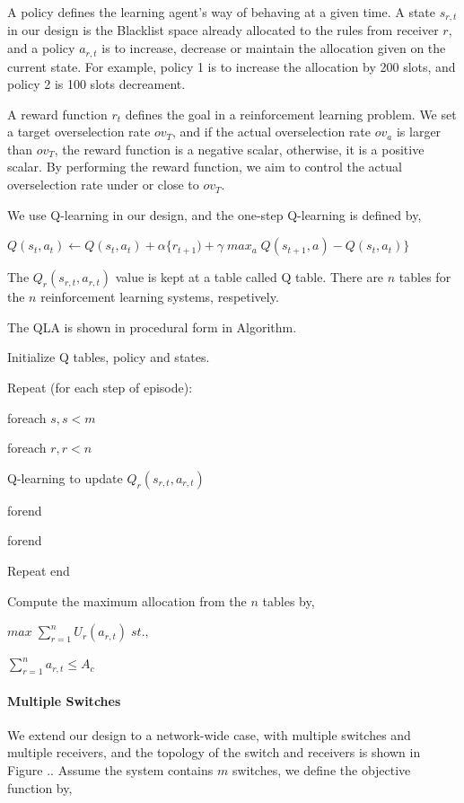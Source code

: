   A policy defines the learning agent's way of behaving at a given time. A state $s_{r,t}$ in our design is the Blacklist space already allocated to the rules from receiver $r$, and a policy $a_{r,t}$ is to increase, decrease or maintain the allocation given on the current state. For example, policy 1 is to increase the allocation by 200 slots, and policy 2 is 100 slots decreament. 
  
  A reward function $r_t$ defines the goal in a reinforcement learning problem. We set a target overselection rate $ov_T$, and if the actual overselection rate $ov_a$ is larger than $ov_T$, the reward function is a negative scalar, otherwise, it is a positive scalar. By performing the reward function, we aim to control the actual overselection rate under or close to $ov_T$.
  
  We use Q-learning in our design, and the one-step Q-learning is defined by,
  
  $Q(s_t,a_t) \leftarrow Q(s_t,a_t) + \alpha \{r_{t+1})+\gamma\;max_{a}\;Q(s_{t+1},a)-Q(s_t,a_t)\}$
  
  The $Q_r(s_{r,t}, a_{r,t})$ value is kept at a table called Q table. There are $n$ tables for the $n$ reinforcement learning systems, respetively.
  
  The QLA is shown in procedural form in Algorithm{}.

  Initialize Q tables, policy and states. 
  
  Repeat (for each step of episode):
  
    foreach $s, s<m$
    
      foreach $r, r<n$
      
	Q-learning to update $Q_r(s_{r,t}, a_{r,t})$
	
      forend
      
    forend
    
  Repeat end
  
  
  Compute the maximum allocation from the $n$ tables by,
  
  $max \; \sum_{r = 1}^{n} U_r(a_{r,t})\;st.,$
  
  $\sum_{r = 1}^{n}a_{r,t} \leq A_c$
  
\paragraph{Multiple Switches}

  We extend our design to a network-wide case, with multiple switches and multiple receivers, and the topology of the switch and receivers is shown in Figure {}.. Assume the system contains $m$ switches, we define the objective function by,
  
